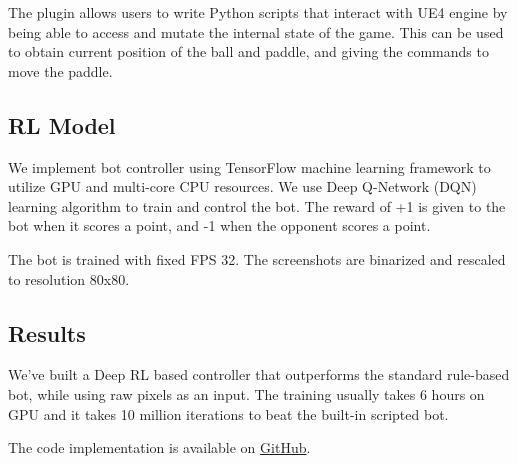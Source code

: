 The plugin allows users to write Python scripts that interact with UE4 engine by being able to access and mutate the internal state of the game.
This can be used to obtain current position of the ball and paddle, and giving the commands to move the paddle.

\subsection{RL Model}

We implement bot controller using TensorFlow machine learning framework \cite{tensorflow2015-whitepaper} to utilize GPU and multi-core CPU resources.
We use Deep Q-Network (DQN) \cite{mnih-dqn-2015} learning algorithm to train and control the bot.
The reward of +1 is given to the bot when it scores a point, and -1 when the opponent scores a point.

The bot is trained with fixed FPS 32. The screenshots are binarized and rescaled to resolution 80x80.

\subsection{Results}

We've built a Deep RL based controller that outperforms the standard rule-based bot, while using raw pixels as an input.
The training usually takes 6 hours on GPU and it takes 10 million iterations to beat the built-in scripted bot.

The code implementation is available on \href{https://github.com/akashin/HSE_AI_Labs/tree/master/Lab_4}{GitHub}.